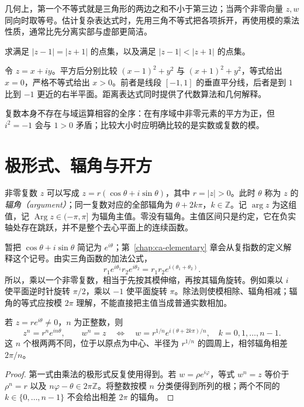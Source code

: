 几何上，第一个不等式就是三角形的两边之和不小于第三边；当两个非零向量 $z,w$ 同向时取等号。估计复杂表达式时，先用三角不等式把各项拆开，再使用模的乘法性质，通常比先分离实部与虚部更简洁。

\begin{example}[从复数方程读出几何轨迹]
求满足 $|z-1|=|z+1|$ 的点集，以及满足 $|z-1|<|z+1|$ 的点集。
\end{example}
\begin{solve}
令 $z=x+iy$。平方后分别比较 $(x-1)^2+y^2$ 与 $(x+1)^2+y^2$，等式给出 $x=0$，严格不等式给出 $x>0$。前者是线段 $[-1,1]$ 的垂直平分线，后者是到 $1$ 比到 $-1$ 更近的右半平面。距离表达式同时提供了代数算法和几何解释。
\end{solve}

复数本身不存在与域运算相容的全序：在有序域中非零元素的平方为正，但 $i^2=-1$ 会与 $1>0$ 矛盾；比较大小时应明确比较的是实数或复数的模。

\section{极形式、辐角与开方}

非零复数 $z$ 可以写成 $z=r(\cos\theta+i\sin\theta)$，其中 $r=|z|>0$。此时 $\theta$ 称为 $z$ 的\emph{辐角（argument）}；同一复数对应的全部辐角为 $\theta+2k\pi$，$k\in\mathbb Z$。记 $\arg z$ 为这组值，记 $\operatorname{Arg}z\in(-\pi,\pi]$ 为辐角主值。零没有辐角。主值区间只是约定，它在负实轴处存在跳跃，并不是整个去心平面上的连续函数。

暂把 $\cos\theta+i\sin\theta$ 简记为 $e^{i\theta}$；第~\ref{chap:ca-elementary} 章会从复指数的定义解释这个记号。由实三角函数的加法公式，
\[
 r_1e^{i\theta_1}r_2e^{i\theta_2}
 =r_1r_2e^{i(\theta_1+\theta_2)}.
\]
所以，乘以一个非零复数，相当于先按其模伸缩，再按其辐角旋转。例如乘以 $i$ 使平面逆时针旋转 $\pi/2$，乘以 $-1$ 使平面旋转 $\pi$。除法则使模相除、辐角相减；辐角的等式应按模 $2\pi$ 理解，不能直接把主值当成普通实数相加。

\begin{proposition}[棣莫弗公式与复数的根]
若 $z=re^{i\theta}\ne0$，$n$ 为正整数，则
\[
 z^n=r^ne^{in\theta},\qquad
 w^n=z\quad\Longleftrightarrow\quad
 w=r^{1/n}e^{i(\theta+2k\pi)/n},\quad k=0,1,\ldots,n-1.
\]
这 $n$ 个根两两不同，位于以原点为中心、半径为 $r^{1/n}$ 的圆周上，相邻辐角相差 $2\pi/n$。
\end{proposition}
\begin{proof}
第一式由乘法的极形式反复使用得到。若 $w=\rho e^{i\varphi}$，等式 $w^n=z$ 等价于 $\rho^n=r$ 以及 $n\varphi-\theta\in2\pi\mathbb Z$。将整数按模 $n$ 分类便得到所列的根；两个不同的 $k\in\{0,\ldots,n-1\}$ 不会给出相差 $2\pi$ 的辐角。
\end{proof}


